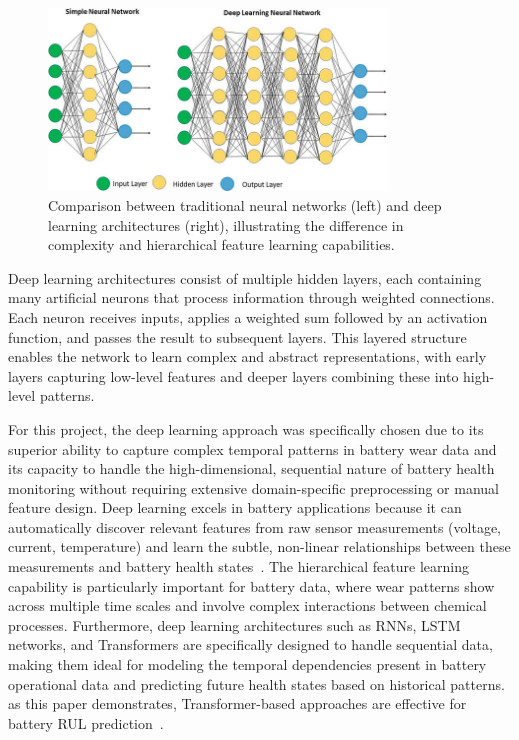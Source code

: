 \begin{figure}[htbp]
\centering
\includegraphics[width=0.8\textwidth]{imgs/neural_vs_deep.png}
\caption{Comparison between traditional neural networks (left) and deep learning architectures (right), illustrating the difference in complexity and hierarchical feature learning capabilities.}
\label{fig:neural_vs_deep}
\end{figure}

Deep learning architectures consist of multiple hidden layers, each containing many artificial neurons that process information through weighted connections. Each neuron receives inputs, applies a weighted sum followed by an activation function, and passes the result to subsequent layers. This layered structure enables the network to learn complex and abstract representations, with early layers capturing low-level features and deeper layers combining these into high-level patterns. 

For this project, the deep learning approach was specifically chosen due to its superior ability to capture complex temporal patterns in battery wear data and its capacity to handle the high-dimensional, sequential nature of battery health monitoring without requiring extensive domain-specific preprocessing or manual feature design. Deep learning excels in battery applications because it can automatically discover relevant features from raw sensor measurements (voltage, current, temperature) and learn the subtle, non-linear relationships between these measurements and battery health states~\cite{noauthor_comprehensive_nodate}. The hierarchical feature learning capability is particularly important for battery data, where wear patterns show across multiple time scales and involve complex interactions between chemical processes. Furthermore, deep learning architectures such as RNNs, LSTM networks, and Transformers are specifically designed to handle sequential data, making them ideal for modeling the temporal dependencies present in battery operational data and predicting future health states based on historical patterns. as this paper demonstrates, Transformer-based approaches are effective for battery RUL prediction~\cite{chen_transformer_2022}.


